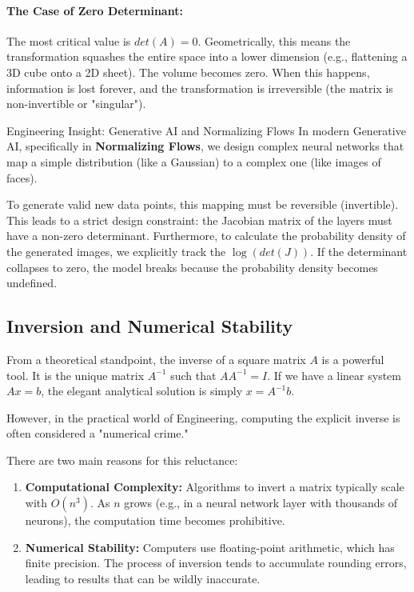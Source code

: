 \paragraph{The Case of Zero Determinant:}
The most critical value is $det(A) = 0$.
Geometrically, this means the transformation squashes the entire space into a lower dimension (e.g., flattening a 3D cube onto a 2D sheet). The volume becomes zero.
When this happens, information is lost forever, and the transformation is irreversible (the matrix is non-invertible or "singular").

\begin{unibobox}{Engineering Insight: Generative AI and Normalizing Flows}
In modern Generative AI, specifically in \textbf{Normalizing Flows}, we design complex neural networks that map a simple distribution (like a Gaussian) to a complex one (like images of faces).

To generate valid new data points, this mapping must be reversible (invertible). This leads to a strict design constraint: the Jacobian matrix of the layers must have a non-zero determinant.
Furthermore, to calculate the probability density of the generated images, we explicitly track the $\log(det(J))$. If the determinant collapses to zero, the model breaks because the probability density becomes undefined.
\end{unibobox}

\subsection{Inversion and Numerical Stability}

From a theoretical standpoint, the inverse of a square matrix $A$ is a powerful tool. It is the unique matrix $A^{-1}$ such that $A A^{-1} = I$. If we have a linear system $Ax = b$, the elegant analytical solution is simply $x = A^{-1}b$.

However, in the practical world of Engineering, computing the explicit inverse is often considered a "numerical crime."

There are two main reasons for this reluctance:
\begin{enumerate}
    \item \textbf{Computational Complexity:} Algorithms to invert a matrix typically scale with $O(n^3)$. As $n$ grows (e.g., in a neural network layer with thousands of neurons), the computation time becomes prohibitive.
    \item \textbf{Numerical Stability:} Computers use floating-point arithmetic, which has finite precision. The process of inversion tends to accumulate rounding errors, leading to results that can be wildly inaccurate.
\end{enumerate}

